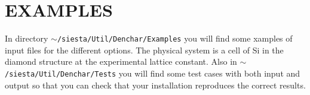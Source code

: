 \section{EXAMPLES}

In directory {\tt $\sim$/siesta/Util/Denchar/Examples} you will find some
xamples of input files for the different options. The physical system is a
cell of Si in the diamond structure at the experimental lattice constant.
Also in {\tt $\sim$/siesta/Util/Denchar/Tests} you will find some
test cases with both input and output so that you can 
check that your installation reproduces the correct results.


